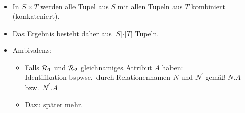 \begin{frame}
\frametitle{\insertsection}
\framesubtitle{\insertsubsection}
\onslide 
{}\\[8pt]
\begin{itemize}
\item In $S\times T$ werden alle Tupel aus $S$ mit allen Tupeln aus $T$ kombiniert (konkateniert).\\[4pt]
\item Das Ergebnis besteht daher aus $\vert S\vert\cdot\vert T\vert$ Tupeln.\\[8pt]
\pause
\item Ambivalenz:
\begin{itemize}
	\item Falls $\mathcal{R}_1$ und $\mathcal{R}_2$ gleichnamiges Attribut $A$ haben:\\
	Identifikation bspwse.~durch Relationennamen $N$ und $N^\prime$ {gem\"a\ss} $N.A$ bzw.~$N^\prime.A$\\[8pt]
	\item Dazu sp\"ater mehr.
\end{itemize}
\end{itemize}
\end{frame}

